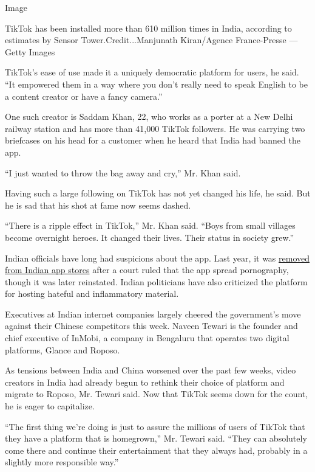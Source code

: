 Image

 TikTok has been installed more than 610 million times in India,
according to estimates by Sensor Tower.Credit...Manjunath Kiran/Agence
France-Presse --- Getty Images

TikTok's ease of use made it a uniquely democratic platform for users,
he said. ``It empowered them in a way where you don't really need to
speak English to be a content creator or have a fancy camera.''

One such creator is Saddam Khan, 22, who works as a porter at a New
Delhi railway station and has more than 41,000 TikTok followers. He was
carrying two briefcases on his head for a customer when he heard that
India had banned the app.

``I just wanted to throw the bag away and cry,'' Mr. Khan said.

Having such a large following on TikTok has not yet changed his life, he
said. But he is sad that his shot at fame now seems dashed.

``There is a ripple effect in TikTok,'' Mr. Khan said. ``Boys from small
villages become overnight heroes. It changed their lives. Their status
in society grew.''

Indian officials have long had suspicions about the app. Last year, it
was
\href{https://www.nytimes.com/2019/04/17/business/india-tiktok-children-privacy.html}{removed
from Indian app stores} after a court ruled that the app spread
pornography, though it was later reinstated. Indian politicians have
also criticized the platform for hosting hateful and inflammatory
material.

Executives at Indian internet companies largely cheered the government's
move against their Chinese competitors this week. Naveen Tewari is the
founder and chief executive of InMobi, a company in Bengaluru that
operates two digital platforms, Glance and Roposo.

As tensions between India and China worsened over the past few weeks,
video creators in India had already begun to rethink their choice of
platform and migrate to Roposo, Mr. Tewari said. Now that TikTok seems
down for the count, he is eager to capitalize.

``The first thing we're doing is just to assure the millions of users of
TikTok that they have a platform that is homegrown,'' Mr. Tewari said.
``They can absolutely come there and continue their entertainment that
they always had, probably in a slightly more responsible way.''

